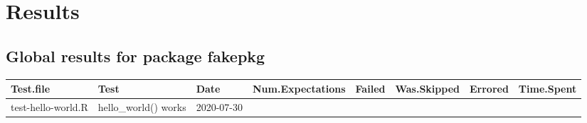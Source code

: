 \documentclass[
]{book}
\begin{document}
\hypertarget{part-results}{%
\part{Results}\label{part-results}}

\hypertarget{global-results-for-package-fakepkg}{%
\chapter*{Global results for package fakepkg}\label{global-results-for-package-fakepkg}}

\begin{longtable}[]{@{}lllrrllr@{}}
\toprule
\begin{minipage}[b]{0.12\columnwidth}\raggedright
Test.file\strut
\end{minipage} & \begin{minipage}[b]{0.23\columnwidth}\raggedright
Test\strut
\end{minipage} & \begin{minipage}[b]{0.07\columnwidth}\raggedright
Date\strut
\end{minipage} & \begin{minipage}[b]{0.11\columnwidth}\raggedleft
Num.Expectations\strut
\end{minipage} & \begin{minipage}[b]{0.05\columnwidth}\raggedleft
Failed\strut
\end{minipage} & \begin{minipage}[b]{0.08\columnwidth}\raggedright
Was.Skipped\strut
\end{minipage} & \begin{minipage}[b]{0.05\columnwidth}\raggedright
Errored\strut
\end{minipage} & \begin{minipage}[b]{0.07\columnwidth}\raggedleft
Time.Spent\strut
\end{minipage}\tabularnewline
\midrule
\endhead
\begin{minipage}[t]{0.12\columnwidth}\raggedright
test-hello-world.R\strut
\end{minipage} & \begin{minipage}[t]{0.23\columnwidth}\raggedright
hello\_world() works\strut
\end{minipage} & \begin{minipage}[t]{0.07\columnwidth}\raggedright
2020-07-30\strut
\end{minipage} & \begin{minipage}[t]{0.11\columnwidth}\raggedleft

\end{minipage}
\end{longtable}
\end{document}

